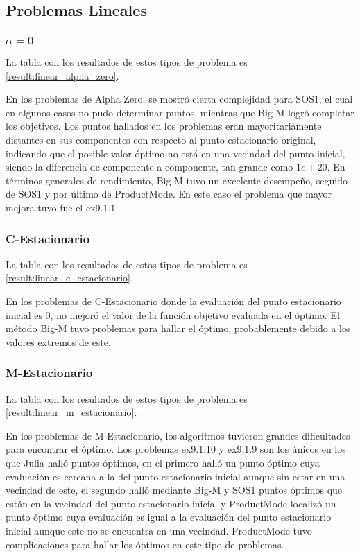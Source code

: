 \subsection{Problemas Lineales} 
  

\subsubsection{$\alpha =0$}
La tabla con los resultados de estos tipos de problema es \ref{result:linear_alpha_zero}.


En los problemas de Alpha Zero, se mostró cierta complejidad para SOS1, el cual en algunos casos no pudo determinar puntos, mientras que Big-M logró completar los objetivos. 
Los puntos hallados en los problemas eran mayoritariamente distantes en sus componentes con respecto al punto estacionario original,  indicando que el posible valor óptimo no está en una vecindad del punto inicial, siendo la diferencia de componente a componente, tan grande como $1e+20$.
En términos generales de rendimiento, Big-M tuvo un excelente desempeño, seguido de SOS1 y por último de ProductMode. 
En este caso el problema que mayor mejora tuvo fue el ex9.1.1



\subsubsection{C-Estacionario}
La tabla con los resultados de estos tipos de problema es \ref{result:linear_c_estacionario}.
 
En los problemas de C-Estacionario donde la evaluación del punto estacionario inicial es 0, no mejoró el valor de la función objetivo evaluada en el óptimo. El método Big-M tuvo problemas para hallar el óptimo, probablemente debido a los valores extremos de este.
 

 

\subsubsection{M-Estacionario}
La tabla con los resultados de estos tipos de problema es \ref{result:linear_m_estacionario}.

En los problemas de M-Estacionario, los algoritmos tuvieron grandes dificultades para encontrar el óptimo. 
Los problemas ex9.1.10 y ex9.1.9 son los únicos en los que Julia halló puntos óptimos, en el primero halló un punto óptimo cuya evaluación es cercana a la del punto estacionario inicial aunque sin estar en una vecindad de este, el segundo halló mediante Big-M y SOS1 puntos óptimos que están en la vecindad del punto estacionario inicial y  ProductMode localizó un punto óptimo cuya evaluación es igual a la evaluación del punto estacionario inicial aunque este no se encuentra en una vecindad. ProductMode tuvo complicaciones para hallar los óptimos en este tipo de problemas.
 
